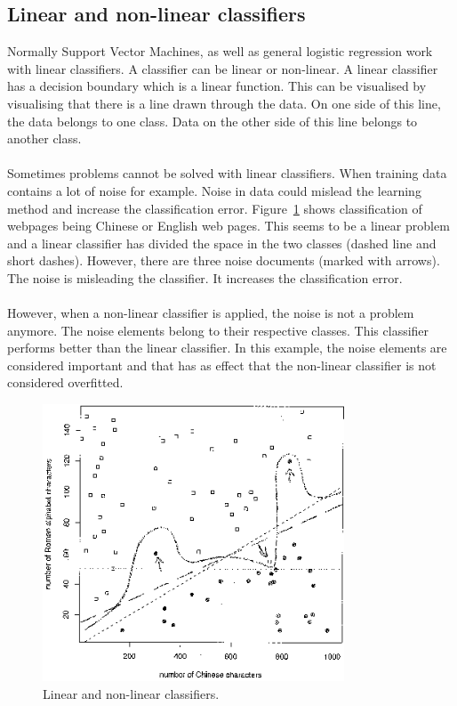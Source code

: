 \subsection{Linear and non-linear classifiers}
\label{linearclass}
\noindent Normally Support Vector Machines, as well as general logistic regression work with linear classifiers. A classifier can be linear or non-linear. A linear classifier has a decision boundary which is a linear function. This can be visualised by visualising that there is a line drawn through the data. On one side of this line, the data belongs to one class. Data on the other side of this line belongs to another class. \cite{linearClassifier} \\
\\
Sometimes problems cannot be solved with linear classifiers. When training data contains a lot of noise for example. Noise in data could mislead the learning method and increase the classification error. Figure~\ref{fig:linearvsNonLinearClassifier} shows classification of webpages being Chinese or English web pages. This seems to be a linear problem and a linear classifier has divided the space in the two classes (dashed line and short dashes). However, there are three noise documents (marked with arrows). The noise is misleading the classifier. It increases the classification error. \cite{linearvsNonLinearClassifier} \\
\\
However, when a non-linear classifier is applied, the noise is not a problem anymore. The noise elements belong to their respective classes. This classifier performs better than the linear classifier. In this example, the noise elements are considered important and that has as effect that the non-linear classifier is not considered overfitted. \cite{linearvsNonLinearClassifier}

\begin{figure}[H]
\centering
\includegraphics[width=0.8\textwidth]{Figures/classifierNoise}
\decoRule
\caption[Linear and non-linear classifiers]{Linear and non-linear classifiers. \cite{linearvsNonLinearClassifier}}
\label{fig:linearvsNonLinearClassifier}
\end{figure}

